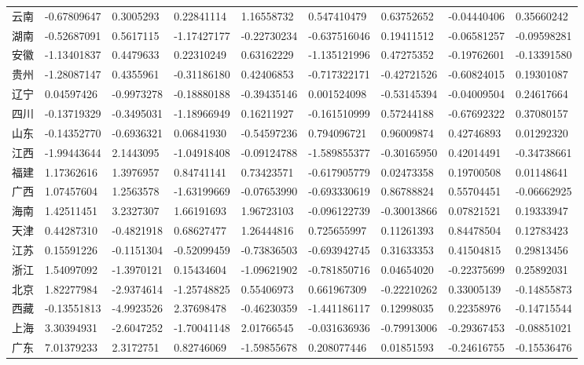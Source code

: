 \documentclass[11pt]{article}
\begin{document}
\begin{tabular}{r|llllllll}
	云南 & -0.67809647 &  0.3005293 &  0.22841114 &  1.16558732 &  0.547410479 &  0.63752652 & -0.04440406 &  0.35660242\\
	湖南 & -0.52687091 &  0.5617115 & -1.17427177 & -0.22730234 & -0.637516046 &  0.19411512 & -0.06581257 & -0.09598281\\
	安徽 & -1.13401837 &  0.4479633 &  0.22310249 &  0.63162229 & -1.135121996 &  0.47275352 & -0.19762601 & -0.13391580\\
	贵州 & -1.28087147 &  0.4355961 & -0.31186180 &  0.42406853 & -0.717322171 & -0.42721526 & -0.60824015 &  0.19301087\\
	辽宁 &  0.04597426 & -0.9973278 & -0.18880188 & -0.39435146 &  0.001524098 & -0.53145394 & -0.04009504 &  0.24617664\\
	四川 & -0.13719329 & -0.3495031 & -1.18966949 &  0.16211927 & -0.161510999 &  0.57244188 & -0.67692322 &  0.37080157\\
	山东 & -0.14352770 & -0.6936321 &  0.06841930 & -0.54597236 &  0.794096721 &  0.96009874 &  0.42746893 &  0.01292320\\
	江西 & -1.99443644 &  2.1443095 & -1.04918408 & -0.09124788 & -1.589855377 & -0.30165950 &  0.42014491 & -0.34738661\\
	福建 &  1.17362616 &  1.3976957 &  0.84741141 &  0.73423571 & -0.617905779 &  0.02473358 &  0.19700508 &  0.01148641\\
	广西 &  1.07457604 &  1.2563578 & -1.63199669 & -0.07653990 & -0.693330619 &  0.86788824 &  0.55704451 & -0.06662925\\
	海南 &  1.42511451 &  3.2327307 &  1.66191693 &  1.96723103 & -0.096122739 & -0.30013866 &  0.07821521 &  0.19333947\\
	天津 &  0.44287310 & -0.4821918 &  0.68627477 &  1.26444816 &  0.725655997 &  0.11261393 &  0.84478504 &  0.12783423\\
	江苏 &  0.15591226 & -0.1151304 & -0.52099459 & -0.73836503 & -0.693942745 &  0.31633353 &  0.41504815 &  0.29813456\\
	浙江 &  1.54097092 & -1.3970121 &  0.15434604 & -1.09621902 & -0.781850716 &  0.04654020 & -0.22375699 &  0.25892031\\
	北京 &  1.82277984 & -2.9374614 & -1.25748825 &  0.55406973 &  0.661967309 & -0.22210262 &  0.33005139 & -0.14855873\\
	西藏 & -0.13551813 & -4.9923526 &  2.37698478 & -0.46230359 & -1.441186117 &  0.12998035 &  0.22358976 & -0.14715544\\
	上海 &  3.30394931 & -2.6047252 & -1.70041148 &  2.01766545 & -0.031636936 & -0.79913006 & -0.29367453 & -0.08851021\\
	广东 &  7.01379233 &  2.3172751 &  0.82746069 & -1.59855678 &  0.208077446 &  0.01851593 & -0.24616755 & -0.15536476\\
\end{tabular}
\end{document}
